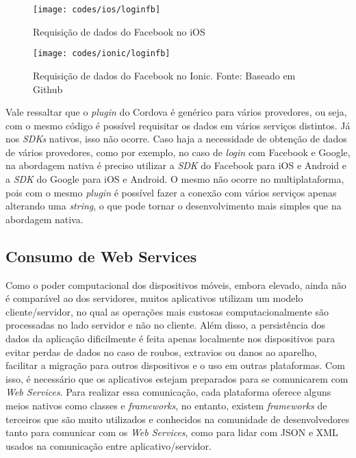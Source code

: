 \begin{figure}[H]
	\centering
	\texttt{[image: codes/ios/loginfb]}
	\caption[Requisição de dados do Facebook no iOS]{Requisição de dados do Facebook no iOS}
	\label{fig:loginfb-ios}
\end{figure}

\begin{figure}[H]
	\centering
	\texttt{[image: codes/ionic/loginfb]}
	\caption[Requisição de dados do Facebook no Ionic]{Requisição de dados do Facebook no Ionic. Fonte: Baseado em Github\protect\footnotemark}
	\label{fig:loginfb-ionic}
\end{figure}


Vale ressaltar que o \textit{plugin} do Cordova é genérico para vários provedores, ou seja, com o mesmo código é possível requisitar os dados em vários serviços distintos. Já nos \textit{SDKs} nativos, isso não ocorre.
Caso haja a necessidade de obtenção de dados de vários provedores, como por exemplo, no caso de \textit{login} com Facebook e Google, na abordagem nativa é preciso utilizar a \textit{SDK} do Facebook para iOS e Android
e a \textit{SDK} do Google para iOS e Android. O mesmo não ocorre no multiplataforma, pois com o mesmo \textit{plugin} é possível fazer a conexão com vários serviços apenas alterando uma \textit{string}, 
o que pode tornar o desenvolvimento mais simples que na abordagem nativa.

\subsection{Consumo de Web Services} \label{subsec:webservices}
Como o poder computacional dos dispositivos móveis, embora elevado, ainda não é comparável ao dos servidores, muitos aplicativos utilizam um modelo cliente/servidor, no qual
as operações mais custosas computacionalmente são processadas no lado servidor e não no cliente. Além disso, a persistência dos dados da aplicação dificilmente é feita apenas localmente nos dispositivos para evitar 
perdas de dados no caso de roubos, extravios ou danos ao aparelho, facilitar a migração para outros dispositivos e o uso em outras plataformas. Com isso, é necessário que os aplicativos estejam preparados para se 
comunicarem com \textit{Web Services}. Para realizar essa comunicação, cada plataforma oferece alguns meios nativos como classes e \textit{frameworks}, no entanto, existem \textit{frameworks} de terceiros que 
são muito utilizados e conhecidos na comunidade de desenvolvedores tanto para comunicar com os \textit{Web Services}, como para lidar com JSON e XML usados na comunicação entre aplicativo/servidor. 

